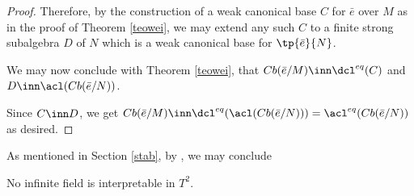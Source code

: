 \begin{proof}
Therefore, by the construction of a weak canonical base $C$ for %
$\bar e$ over $M$ as in the proof of Theorem \ref{teowei},
we may extend any such $C$ to a finite strong subalgebra $D$ of $N$ which is a weak canonical base for $\tp{\bar e}{N}$.

%

We may now conclude with Theorem \ref{teowei}, that
$Cb(\bar e/M)\inn\dcl^{eq}(C)$ and $D\inn\acl(Cb(\bar e/N))$.

%
%
%
Since $C\inn D$, we get $Cb(\bar e/M)\inn\dcl^{eq}(\acl(Cb(\bar e/N)))=\acl^{eq}(Cb(\bar e/N))$ as desired.
\end{proof}

As mentioned in Section \ref{stab}, by \cite[Proposition 3.2]{pilcm}, we may conclude
\begin{cor}
No infinite field is interpretable in $T^{2}$.
\end{cor}
\cbend